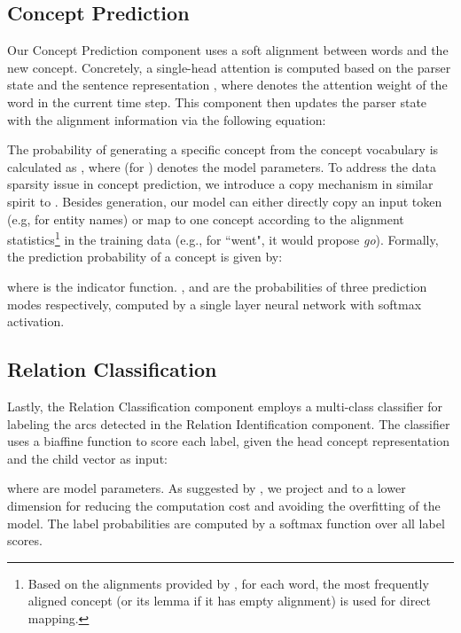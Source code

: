 \documentclass[11pt,a4paper]{article}
\begin{document}
	\subsection{Concept Prediction}
	\label{cp}
	Our Concept Prediction component uses a soft alignment between words and the new concept. Concretely, a single-head attention  is computed based on the parser state   and the sentence representation , where  denotes the attention weight of the word  in the current time step. This component then updates the parser state with the alignment information via the following equation:
	
	
	The probability of generating a specific concept  from the concept vocabulary  is calculated as , where  (for ) denotes the model parameters. To address the data sparsity issue in concept prediction, we introduce a copy mechanism in similar spirit to . Besides generation, our model can either directly copy an input token  (e.g, for entity names) or map  to one concept  according to the alignment statistics\footnote{Based on the alignments provided by , for each word, the most frequently aligned concept (or its lemma if it has empty alignment) is used for direct mapping.} in the training data (e.g., for ``went", it would propose \textit{go}). Formally, the prediction probability of a concept  is given by:
	 
	where  is the indicator function. ,  and  are the probabilities of three prediction modes respectively, computed by a single layer neural network with softmax activation.
	\subsection{Relation Classification}
	\label{rc}
	Lastly, the Relation Classification component employs a multi-class classifier for labeling the arcs detected in the Relation Identification component. The classifier uses a biaffine function to score each label, given the head concept representation  and the child vector  as input:
	
	where  are model parameters. As suggested by , we project  and  to a lower dimension for reducing the computation cost and avoiding the overfitting of the model. The label probabilities are computed by a softmax function over all label scores.
\end{document}

